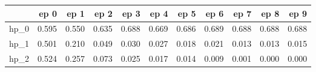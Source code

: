 \begin{tabular}{lrrrrrrrrrr}
\toprule
{} &   ep 0 &   ep 1 &   ep 2 &   ep 3 &   ep 4 &   ep 5 &   ep 6 &   ep 7 &   ep 8 &   ep 9 \\
\midrule
hp\_0 &  0.595 &  0.550 &  0.635 &  0.688 &  0.669 &  0.686 &  0.689 &  0.688 &  0.688 &  0.688 \\
hp\_1 &  0.501 &  0.210 &  0.049 &  0.030 &  0.027 &  0.018 &  0.021 &  0.013 &  0.013 &  0.015 \\
hp\_2 &  0.524 &  0.257 &  0.073 &  0.025 &  0.017 &  0.014 &  0.009 &  0.001 &  0.000 &  0.000 \\
\bottomrule
\end{tabular}
